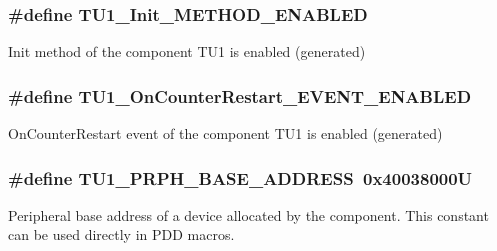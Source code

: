 \subsubsection[{\texorpdfstring{T\+U1\+\_\+\+Init\+\_\+\+M\+E\+T\+H\+O\+D\+\_\+\+E\+N\+A\+B\+L\+ED}{TU1_Init_METHOD_ENABLED}}]{\setlength{\rightskip}{0pt plus 5cm}\#define T\+U1\+\_\+\+Init\+\_\+\+M\+E\+T\+H\+O\+D\+\_\+\+E\+N\+A\+B\+L\+ED}\hypertarget{group___t_u1__module_ga2532ba47f579738a2f954e79d2d99e9d}{}\label{group___t_u1__module_ga2532ba47f579738a2f954e79d2d99e9d}
Init method of the component T\+U1 is enabled (generated) 
\subsubsection[{\texorpdfstring{T\+U1\+\_\+\+On\+Counter\+Restart\+\_\+\+E\+V\+E\+N\+T\+\_\+\+E\+N\+A\+B\+L\+ED}{TU1_OnCounterRestart_EVENT_ENABLED}}]{\setlength{\rightskip}{0pt plus 5cm}\#define T\+U1\+\_\+\+On\+Counter\+Restart\+\_\+\+E\+V\+E\+N\+T\+\_\+\+E\+N\+A\+B\+L\+ED}\hypertarget{group___t_u1__module_ga776fe3d89696e57b98cf36b71dbcc86c}{}\label{group___t_u1__module_ga776fe3d89696e57b98cf36b71dbcc86c}
On\+Counter\+Restart event of the component T\+U1 is enabled (generated) 
\subsubsection[{\texorpdfstring{T\+U1\+\_\+\+P\+R\+P\+H\+\_\+\+B\+A\+S\+E\+\_\+\+A\+D\+D\+R\+E\+SS}{TU1_PRPH_BASE_ADDRESS}}]{\setlength{\rightskip}{0pt plus 5cm}\#define T\+U1\+\_\+\+P\+R\+P\+H\+\_\+\+B\+A\+S\+E\+\_\+\+A\+D\+D\+R\+E\+SS~0x40038000U}\hypertarget{group___t_u1__module_ga791d7a56f94f745b0dbb9a0ff09ee0d4}{}\label{group___t_u1__module_ga791d7a56f94f745b0dbb9a0ff09ee0d4}
Peripheral base address of a device allocated by the component. This constant can be used directly in P\+DD macros. 

